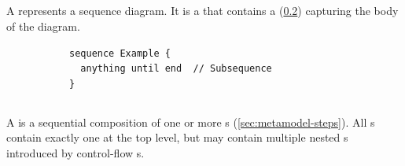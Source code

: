 \subsection{\msequence}\label{ssec:metamodel-sequences-sequences}

A \msequence{} represents a sequence diagram.  It is a \mnamedelement{}
that contains a \msubsequence{} (\cref{ssec:metamodel-sequences-subsequences})
capturing the body of the diagram.

\begin{figure}[h!]

  \begin{subfigure}[t]{\egtextwidth}
    \begin{lstlisting}[style=Example]
sequence Example {
  anything until end  // Subsequence
}
    \end{lstlisting}
  \end{subfigure}
  \hfill
  \begin{subfigure}[t]{\eggraphicalwidth}
    \gsecaption
    \centering
  \end{subfigure}

\end{figure}

\subsection{\msubsequence}\label{ssec:metamodel-sequences-subsequences}

A \msubsequence{} is a sequential composition of one or more \msequencestep s
(\cref{sec:metamodel-steps}).
All \msequence s contain exactly one \msubsequence{} at the top level, but
may contain multiple nested \msubsequence s introduced by control-flow
\msequencestep s.

